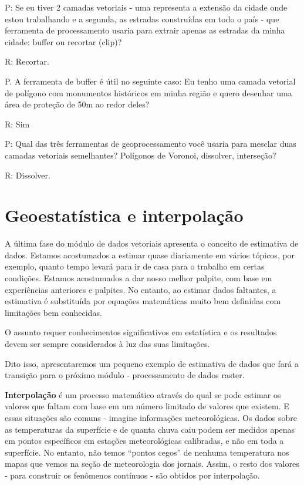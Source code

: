 \documentclass[
  portuguese,
]{krantz}
\begin{document}
P: Se eu tiver 2 camadas vetoriais - uma representa a extensão da cidade onde estou trabalhando e a segunda, as estradas construídas em todo o país - que ferramenta de processamento usaria para extrair apenas as estradas da minha cidade: buffer ou recortar (clip)?

R: Recortar.

P. A ferramenta de buffer é útil no seguinte caso: Eu tenho uma camada vetorial de polígono com monumentos históricos em minha região e quero desenhar uma área de proteção de 50m ao redor deles?

R: Sim

P: Qual das três ferramentas de geoprocessamento você usaria para mesclar duas camadas vetoriais semelhantes? Polígonos de Voronoi, dissolver, interseção?

R: Dissolver.

\hypertarget{geoestatuxedstica-e-interpolauxe7uxe3o}{%
\section{Geoestatística e interpolação}\label{geoestatuxedstica-e-interpolauxe7uxe3o}}

A última fase do módulo de dados vetoriais apresenta o conceito de estimativa de dados. Estamos acostumados a estimar quase diariamente em vários tópicos, por exemplo, quanto tempo levará para ir de casa para o trabalho em certas condições. Estamos acostumados a dar nosso melhor palpite, com base em experiências anteriores e palpites. No entanto, ao estimar dados faltantes, a estimativa é substituída por equações matemáticas muito bem definidas com limitações bem conhecidas.

O assunto requer conhecimentos significativos em estatística e os resultados devem ser sempre considerados à luz das suas limitações.

Dito isso, apresentaremos um pequeno exemplo de estimativa de dados que fará a transição para o próximo módulo - processamento de dados raster.

\textbf{Interpolação} é um processo matemático através do qual se pode estimar os valores que faltam com base em um número limitado de valores que existem. E essas situações são comuns - imagine informações meteorológicas. Os dados sobre as temperaturas da superfície e de quanta chuva caiu podem ser medidos apenas em pontos específicos em estações meteorológicas calibradas, e não em toda a superfície. No entanto, não temos ``pontos cegos'' de nenhuma temperatura nos mapas que vemos na seção de meteorologia dos jornais. Assim, o resto dos valores - para construir os fenômenos contínuos - são obtidos por interpolação.
\end{document}
